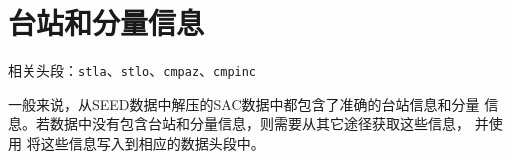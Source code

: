 \section{台站和分量信息}
相关头段：\texttt{stla}、\texttt{stlo}、\texttt{cmpaz}、\texttt{cmpinc}

一般来说，从SEED数据中解压的SAC数据中都包含了准确的台站信息和分量
信息。若数据中没有包含台站和分量信息，则需要从其它途径获取这些信息，
并使用  将这些信息写入到相应的数据头段中。
